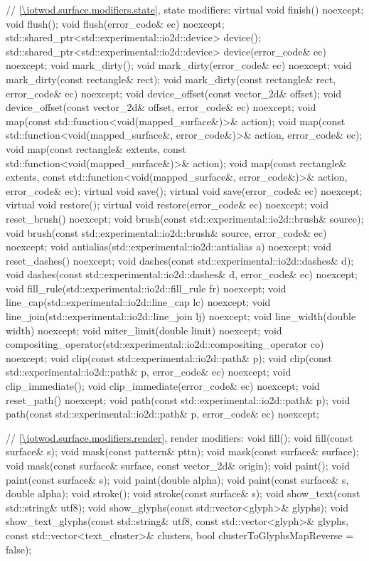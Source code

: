\begin{codeblock}
{{{{{    // \ref{\iotwod.surface.modifiers.state}, state modifiers:
    virtual void finish() noexcept;
    void flush();
    void flush(error_code& ec) noexcept;
    std::shared_ptr<std::experimental::io2d::device> device();
    std::shared_ptr<std::experimental::io2d::device> device(error_code& ec)
      noexcept;
    void mark_dirty();
    void mark_dirty(error_code& ec) noexcept;
    void mark_dirty(const rectangle& rect);
    void mark_dirty(const rectangle& rect, error_code& ec) noexcept;
    void device_offset(const vector_2d& offset);
    void device_offset(const vector_2d& offset, error_code& ec) noexcept;
    void map(const std::function<void(mapped_surface&)>& action);
    void map(const std::function<void(mapped_surface&, error_code&)>& action,
      error_code& ec);
    void map(const rectangle& extents,
      const std::function<void(mapped_surface&)>& action);
    void map(const rectangle& extents,
      const std::function<void(mapped_surface&, error_code&)>& action,
      error_code& ec);
    virtual void save();
    virtual void save(error_code& ec) noexcept;
    virtual void restore();
    virtual void restore(error_code& ec) noexcept;
    void reset_brush() noexcept;
    void brush(const std::experimental::io2d::brush& source);
    void brush(const std::experimental::io2d::brush& source, error_code& ec)
      noexcept;
    void antialias(std::experimental::io2d::antialias a) noexcept;
    void reset_dashes() noexcept;
    void dashes(const std::experimental::io2d::dashes& d);
    void dashes(const std::experimental::io2d::dashes& d, error_code& ec)
      noexcept;
    void fill_rule(std::experimental::io2d::fill_rule fr) noexcept;
    void line_cap(std::experimental::io2d::line_cap lc) noexcept;
    void line_join(std::experimental::io2d::line_join lj) noexcept;
    void line_width(double width) noexcept;
    void miter_limit(double limit) noexcept;
    void compositing_operator(std::experimental::io2d::compositing_operator co)
      noexcept;
    void clip(const std::experimental::io2d::path& p);
    void clip(const std::experimental::io2d::path& p, error_code& ec) noexcept;
    void clip_immediate();
    void clip_immediate(error_code& ec) noexcept;
    void reset_path() noexcept;
    void path(const std::experimental::io2d::path& p);
    void path(const std::experimental::io2d::path& p, error_code& ec) noexcept;

    // \ref{\iotwod.surface.modifiers.render}, render modifiers:
    void fill();
    void fill(const surface& s);
    void mask(const pattern& pttn);
    void mask(const surface& surface);
    void mask(const surface& surface, const vector_2d& origin);
    void paint();
    void paint(const surface& s);
    void paint(double alpha);
    void paint(const surface& s, double alpha);
    void stroke();
    void stroke(const surface& s);
    void show_text(const std::string& utf8);
    void show_glyphs(const std::vector<glyph>& glyphs);
    void show_text_glyphs(const std::string& utf8,
      const std::vector<glyph>& glyphs,
      const std::vector<text_cluster>& clusters, 
      bool clusterToGlyphsMapReverse = false);

}}}}}
\end{codeblock}
